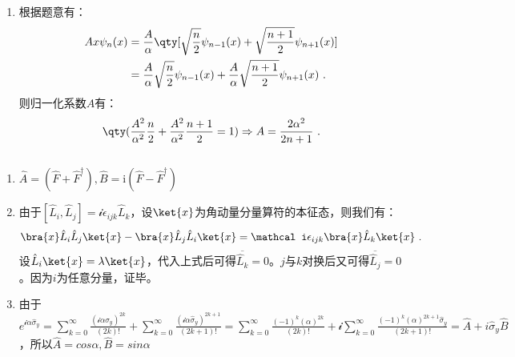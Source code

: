 
\begin{issues}
\issueDraft
\end{issues}

\subsection{ }
\begin{enumerate}
\item 根据题意有：
\begin{equation}
\begin{aligned}
Ax\psi_n(x)&=\frac{A}{\alpha}\qty[\sqrt{\frac{n}{2}}\psi_{n-1}(x)+\sqrt{\frac{n+1}{2}}\psi_{n+1}(x)] \\
&=\frac{A}{\alpha}\sqrt{\frac{n}{2}}\psi_{n-1}(x)+\frac{A}{\alpha}\sqrt{\frac{n+1}{2}}\psi_{n+1}(x)~.
\end{aligned}
\end{equation}
则归一化系数$A$有：
\begin{equation}
\qty(\frac{A^2}{{\alpha}^2}\frac{n}{2}+\frac{A^2}{{\alpha}^2}\frac{n+1}{2}=1)\Rightarrow A=\frac{2\alpha^2}{2n+1}~.
\end{equation}
\end{enumerate}
\subsection{ }
\begin{enumerate}
\item $\hat A=(\hat F+\hat F^\dagger),\hat B=\mathrm i(\hat F-\hat F^\dagger)$
\item 
由于$[\hat L_i,\hat L_j]=\mathcal i\epsilon_{ijk}\hat L_k$，设$\ket{x}$为角动量分量算符的本征态，则我们有：
\begin{equation}
\bra{x}\hat L_i\hat L_j\ket{x}-\bra{x}\hat L_j\hat L_i\ket{x}=\mathcal i\epsilon_{ijk}\bra{x}\hat L_k\ket{x}~.
\end{equation}
设$\hat L_i\ket{x}=\lambda\ket{x}$，代入上式后可得$\overline {\hat L_k}=0$。$j$与$k$对换后又可得$\overline {\hat L_j}=0$。因为$i$为任意分量，证毕。
\item 由于$e^{\mathcal i\alpha \hat {\sigma}_y}=\sum\limits^{\infty}_{k=0}\frac{(\mathcal i \alpha \hat {\sigma}_y)^{2k}}{(2k)!}+\sum\limits^{\infty}_{k=0}\frac{(\mathcal i \alpha \hat {\sigma}_y)^{2k+1}}{(2k+1)!}=\sum\limits^{\infty}_{k=0}\frac{(-1)^k (\alpha )^{2k}}{(2k)!}+\mathcal i\sum\limits^{\infty}_{k=0}\frac{(-1)^k( \alpha )^{2k+1}\hat {\sigma}_y}{(2k+1)!}=\hat A+i\hat {\sigma}_y \hat B$，所以$\hat A=cos\alpha,\hat B=sin\alpha$
\end{enumerate}
\subsection{ }
\subsection{ }
\subsection{ }
